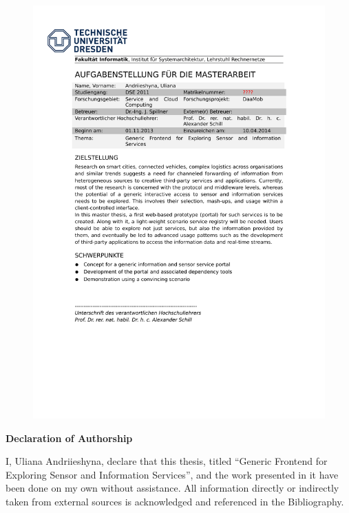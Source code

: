 \documentclass[a4paper, 12pt, twoside]{book}
\begin{document}
	
\newpage
\thispagestyle{empty}
\mbox{}

\newpage
\begin{figure}[h!]
\centering
\includegraphics[scale=0.9]{images/AUFGABENSTELLUNG_Uliana.pdf}
\end{figure}
\thispagestyle{empty}
\mbox{}

\newpage
\thispagestyle{empty}
\mbox{}
\newpage
\thispagestyle{empty}
\begingroup
  \vspace*{50 mm}
  {\huge \bf Declaration of Authorship}
  \vspace{10 mm}

  I, Uliana Andriieshyna, declare that this thesis, titled ``Generic Frontend for Exploring Sensor and Information Services'', and the work presented in it have been done on my own without assistance. All information directly or indirectly taken from external sources is acknowledged and referenced in the Bibliography.
\end{document}
